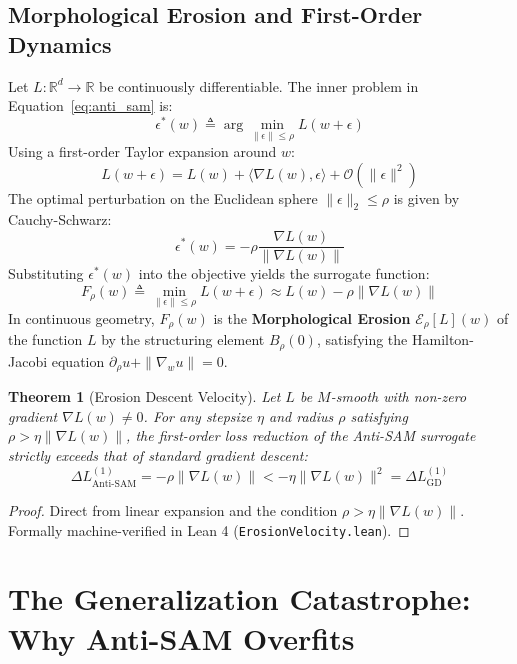 \documentclass[11pt,a4paper]{article}
\newtheorem{theorem}{Theorem}
\begin{document}
\subsection{Morphological Erosion and First-Order Dynamics}
Let $L: \mathbb{R}^d \to \mathbb{R}$ be continuously differentiable. The inner problem in Equation~\eqref{eq:anti_sam} is:
\begin{equation}
\epsilon^*(w) \triangleq \arg\min_{\|\epsilon\| \le \rho} L(w + \epsilon)
\end{equation}
Using a first-order Taylor expansion around $w$:
\begin{equation}
L(w + \epsilon) = L(w) + \langle \nabla L(w), \epsilon \rangle + \mathcal{O}(\|\epsilon\|^2)
\end{equation}
The optimal perturbation on the Euclidean sphere $\|\epsilon\|_2 \le \rho$ is given by Cauchy-Schwarz:
\begin{equation}
\epsilon^*(w) = -\rho \frac{\nabla L(w)}{\|\nabla L(w)\|}
\end{equation}
Substituting $\epsilon^*(w)$ into the objective yields the surrogate function:
\begin{equation}
F_\rho(w) \triangleq \min_{\|\epsilon\| \le \rho} L(w + \epsilon) \approx L(w) - \rho \|\nabla L(w)\|
\end{equation}
In continuous geometry, $F_\rho(w)$ is the \textbf{Morphological Erosion} $\mathcal{E}_\rho[L](w)$ of the function $L$ by the structuring element $B_\rho(0)$, satisfying the Hamilton-Jacobi equation $\partial_\rho u + \|\nabla_w u\| = 0$.

\begin{theorem}[Erosion Descent Velocity]
Let $L$ be $M$-smooth with non-zero gradient $\nabla L(w) \ne 0$. For any stepsize $\eta$ and radius $\rho$ satisfying $\rho > \eta \|\nabla L(w)\|$, the first-order loss reduction of the Anti-SAM surrogate strictly exceeds that of standard gradient descent:
\begin{equation}
\Delta L_{\text{Anti-SAM}}^{(1)} = -\rho \|\nabla L(w)\| < -\eta \|\nabla L(w)\|^2 = \Delta L_{\text{GD}}^{(1)}
\end{equation}
\end{theorem}
\begin{proof}
Direct from linear expansion and the condition $\rho > \eta \|\nabla L(w)\|$. Formally machine-verified in Lean 4 (\texttt{ErosionVelocity.lean}).
\end{proof}

\section{The Generalization Catastrophe: Why Anti-SAM Overfits}
\end{document}
